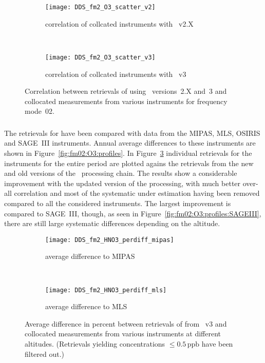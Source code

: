 \begin{figure}[htpb]
    \centering
    \begin{subfigure}[b]{0.49\textwidth}
        \texttt{[image: DDS\_fm2\_O3\_scatter\_v2]}
        \caption{correlation of collcated instruments with \smr~v2.X}
        \label{fig:fm02:O3:scatter:v2}
    \end{subfigure}
    \,
    \begin{subfigure}[b]{0.49\textwidth}
        \texttt{[image: DDS\_fm2\_O3\_scatter\_v3]}
        \caption{correlation of collcated instruments with \smr~v3}
        \label{fig:fm02:O3:scatter:v3}
    \end{subfigure}
    \caption{Correlation between retrievals of  using \smr\
    versions~2.X and~3 and collocated measurements from various instruments
    for frequency mode~02.}
    \label{fig:fm02:O3:scatter}
\end{figure}

\subsubsection{}
\label{sec:fm02:comparison:O3}
The retrievals for \chem{O_3} have been compared with data from the MIPAS, MLS,
OSIRIS and SAGE~III instruments. Annual average differences to these
instruments are shown in Figure~\ref{fig:fm02:O3:profiles}. In
Figure~\ref{fig:fm02:O3:scatter} individual retrievals for the instruments for
the entire period are plotted agains the retrievals from the new and old
versions of the \smr\ processing chain. The results show a considerable
improvement with the updated version of the processing, with much better
over-all correlation and most of the systematic under estimation having been
removed compared to all the considered instruments. The largest improvement is
compared to SAGE~III, though, as seen in
Figure~\ref{fig:fm02:O3:profiles:SAGEIII}, there are still large systematic
differences depending on the altitude.



\begin{figure}[htpb]
    \centering
    \begin{subfigure}[b]{0.49\textwidth}
        \texttt{[image: DDS\_fm2\_HNO3\_perdiff\_mipas]}
        \caption{average difference to MIPAS}
        \label{fig:fm02:HNO3:profiles:MIPAS}
    \end{subfigure}
    \,
    \begin{subfigure}[b]{0.49\textwidth}
        \texttt{[image: DDS\_fm2\_HNO3\_perdiff\_mls]}
        \caption{average difference to MLS}
        \label{fig:fm02:HNO3:profiles:MLS}
    \end{subfigure}
    \caption{Average difference in percent between retrievals of 
    from \smr~v3 and collocated measurements from various instruments at
    different altitudes. (Retrievals yielding concentrations
    $\leq 0.5\,\mathrm{ppb}$ have been filtered out.)}

    \label{fig:fm02:HNO3:profiles}
\end{figure}

